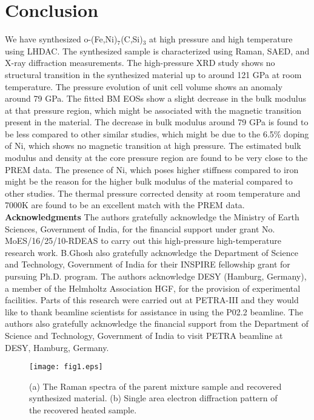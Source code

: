 \documentclass[prb,aps,preprint]{revtex4-2}
\begin{document}
\section{Conclusion}
We have synthesized o-(Fe,Ni)$_{7}$(C,Si)$_{3}$ at high pressure and high temperature using LHDAC. The synthesized sample is characterized using Raman, SAED, and X-ray diffraction measurements. The high-pressure XRD study shows no structural transition in the synthesized material up to around 121 GPa at room temperature. The pressure evolution of unit cell volume shows an anomaly around 79 GPa. The fitted BM EOSs show a slight decrease in the bulk modulus at that pressure region, which might be associated with the magnetic transition present in the material. The decrease in bulk modulus around 79 GPa is found to be less compared to other similar studies, which might be due to the 6.5\% doping of Ni, which shows no magnetic transition at high pressure. The estimated bulk modulus and density at the core pressure region are found to be very close to the PREM data. The presence of Ni, which poses higher stiffness compared to iron might be the reason for the higher bulk modulus of the material compared to other studies. The thermal pressure corrected density at room temperature and 7000K are found to be an excellent match with the PREM data.
\newline
{\bf Acknowledgments}
The authors gratefully acknowledge the Ministry of Earth Sciences, Government of India, for the financial support under grant No. MoES/16/25/10-RDEAS to carry out this high-pressure high-temperature research work. B.Ghosh also gratefully acknowledge the Department of Science and Technology, Government of India for their INSPIRE fellowship grant for pursuing
Ph.D. program. The authors acknowledge DESY (Hamburg, Germany), a member of the Helmholtz Association HGF, for the provision of experimental facilities. Parts of this research were carried out at PETRA-III and they would like to thank beamline scientists for assistance in using the P02.2 beamline. The authors also gratefully acknowledge the financial support from the Department of Science and Technology, Government of India to visit PETRA beamline at DESY, Hamburg, Germany. 



\newpage

\begin{figure}
	\centering
	\texttt{[image: fig1.eps]}
	\caption{\label{Fig.1}(a) The Raman spectra of the parent mixture sample and recovered synthesized material. (b) Single area electron diffraction pattern of the recovered heated sample. 
	  }
\end{figure}
\end{document}
